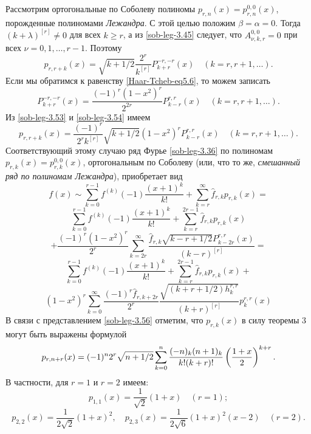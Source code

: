  Рассмотрим ортогональные по Соболеву полиномы $p_{r,n}(x)=p_{r,n}^{0,0}(x)$, порожденные полиномами \textit{Лежандра}. С этой целью положим $\beta=\alpha=0$. Тогда  $(k+\lambda)^{[r]}\neq0$ для всех $k\ge r$, а из \eqref{sob-leg-3.45} следует, что $A_{\nu,k,r}^{0,0}=0$ при всех  $\nu=0,1,\dots, r-1$. Поэтому
\begin{equation}\label{sob-leg-3.53}
p_{r,r+k}(x) =\sqrt{k+1/2}
\frac{2^r}{k^{[r]}}P_{k+r}^{-r,-r}(x) \quad (k=r,r+1,\ldots).
\end{equation}
Если мы обратимся к равенству \eqref{Haar-Tcheb-eq5.6}, то можем записать
\begin{equation}\label{sob-leg-3.54}
P_{k+r}^{-r,-r}(x)= \frac{(-1)^r(1-x^2)^r}{2^{2r}}P_{k-r}^{r,r}(x) \quad (k=r,r+1,\ldots).
\end{equation}
Из \eqref{sob-leg-3.53} и \eqref{sob-leg-3.54} имеем
\begin{equation}\label{sob-leg-3.55}
p_{r,r+k}(x) =
\frac{(-1)^r}{2^rk^{[r]}}\sqrt{k+1/2}(1-x^2)^rP_{k-r}^{r,r}(x) \quad (k=r,r+1,\ldots).
\end{equation}
Соответствующий этому случаю ряд Фурье \eqref{sob-leg-3.36} по полиномам $p_{r,k}(x)=p_{r,k}^{0,0}(x)$, ортогональным по Соболеву (или, что то же, \textit{смешанный ряд по полиномам  Лежандра}), приобретает вид
$$
f(x)\sim \sum_{k=0}^{r-1} f^{(k)}(-1)\frac{(x+1)^k}{k!}+\sum_{k=r}^\infty \hat f_{r,k}p_{r,k}(x)=
$$
$$
 \sum_{k=0}^{r-1} f^{(k)}(-1)\frac{(x+1)^k}{k!}+\sum_{k=r}^{2r-1} \hat f_{r,k}p_{r,k}(x)
$$
$$
+\frac{(-1)^r(1-x^2)^r}{2^r}\sum_{k=2r}^\infty \frac{\hat f_{r,k}\sqrt{k-r+1/2}P_{k-2r}^{r,r}(x)}{(k-r)^{[r]}}=
$$
$$
 \sum_{k=0}^{r-1} f^{(k)}(-1)\frac{(x+1)^k}{k!}+\sum_{k=r}^{2r-1} \hat f_{r,k}p_{r,k}(x)+
$$
\begin{equation}\label{sob-leg-3.56}
 (1-x^2)^r\sum_{k=0}^\infty\frac{(-1)^r\hat f_{r,k+2r}}{2^r} \frac{\sqrt{(k+r+1/2)h_k^{r,r}}}{ (k+r)^{[r]}}p_{k}^{r,r}(x)
\end{equation}
В связи с представлением \eqref{sob-leg-3.56} отметим, что  $p_{r,k}(x)$ в силу теоремы 3 могут быть  выражены формулой
\begin{equation}\label{sob-leg-5.57}
p_{r,n+r}(x)=(-1)^n2^{r}\sqrt{n+1/2}
\sum_{k=0}^n{(-n)_k(n+1)_k\over k!(k+r)!}
\left({1+x\over 2}\right)^{k+r}.
\end{equation}
В частности, для  $r=1$ и $r=2$ имеем:
\begin{equation}\label{sob-leg-3.58}
 p_{1,1}(x)=\frac{1}{\sqrt{2}}(1+x)\quad (r=1);
\end{equation}
\begin{equation}\label{sob-leg-3.59}
 p_{2,2}(x)=\frac{1}{2\sqrt{2}}(1+x)^2,\quad p_{2,3}(x)=\frac{1}{2\sqrt{6}}(1+x)^2(x-2)\quad(r=2).
\end{equation}

